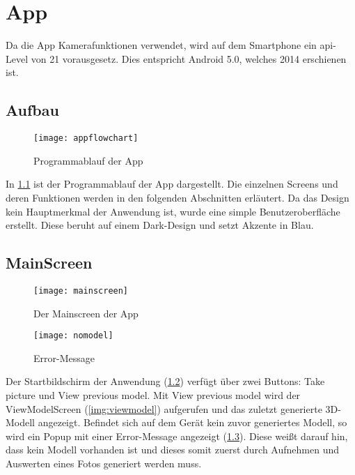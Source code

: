 \chapter{App}
\label{ch:app}

Da die App Kamerafunktionen verwendet, wird auf dem Smartphone ein \acrshort{api}-Level von 21 vorausgesetz. Dies entspricht Android 5.0, welches 2014 erschienen ist.

\section{Aufbau}
\begin{figure}[htpb]
    \centering
    \texttt{[image: appflowchart]}
    \caption{Programmablauf der App}
    \label{img:appflowchart}
\end{figure}

In \ref{img:appflowchart} ist der Programmablauf der App dargestellt. Die einzelnen Screens und deren Funktionen werden in den folgenden Abschnitten erläutert. \newline
Da das Design kein Hauptmerkmal der Anwendung ist, wurde eine simple Benutzeroberfläche erstellt. Diese beruht auf einem Dark-Design und setzt Akzente in Blau.

\pagebreak
\section{MainScreen}
\label{sec:mainscreen}
\begin{figure}[htpb]
    \centering
    \texttt{[image: mainscreen]}
    \caption{Der Mainscreen der App}
    \label{img:mainscreen}
\end{figure}

\begin{figure}[htpb]
    \centering
    \texttt{[image: nomodel]}
    \caption{Error-Message}
    \label{img:nomodel}
\end{figure}

Der Startbildschirm der Anwendung (\ref{img:mainscreen}) verfügt über zwei Buttons: \glqq{}Take picture\grqq{} und \glqq{}View previous model\grqq{}. \newline
Mit \glqq{}View previous model\grqq{} wird der ViewModelScreen (\ref{img:viewmodel}) aufgerufen und das zuletzt generierte 3D-Modell angezeigt. Befindet sich auf dem Gerät 
kein zuvor generiertes Modell, so wird ein Popup mit einer Error-Message angezeigt (\ref{img:nomodel}). Diese weißt darauf hin, dass kein Modell vorhanden ist und dieses somit zuerst 
durch Aufnehmen und Auswerten eines Fotos generiert werden muss.

